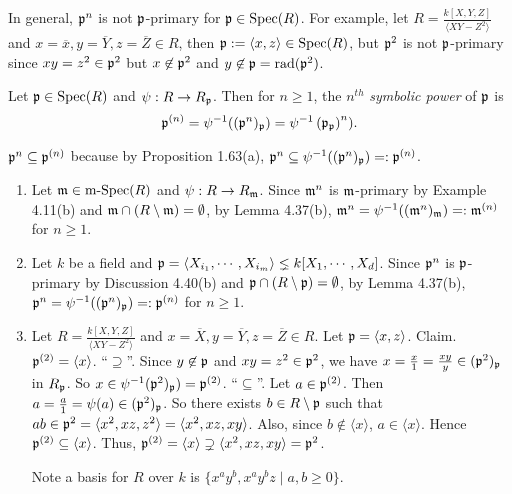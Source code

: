 \begin{example}
    In general, $\mathfrak{p}^{n}$ is not $\mathfrak{p}$-primary for $\mathfrak{p} \in \operatorname{Spec}(R)$. For example, let $R = \frac{k[X,Y,Z]}{\langle XY-Z^{2} \rangle}$ and $x = \overline x,y = \overline Y, z = \overline Z \in R$, then $\mathfrak{p} := \langle x,z \rangle \in \operatorname{Spec}(R)$, but $\mathfrak{p}^{2}$ is not $\mathfrak{p}$-primary since $xy = z^{2} \in \mathfrak{p}^{2}$ but $x \not \in \mathfrak{p}^{2}$ and $y \not \in \mathfrak{p} = \operatorname{rad}(\mathfrak{p}^{2})$.
\end{example}

\begin{definition}
    Let $\mathfrak{p} \in \operatorname{Spec}(R)$ and $\psi: R \to R_{\mathfrak{p}}$. Then for $n \geq 1$, the $n^{th}$ \emph{symbolic power} of $\mathfrak{p}$ is \[\mathfrak{p}^{(n)} = \psi^{-1}((\mathfrak{p}^{n})_{\mathfrak{p}}) = \psi^{-1}\left( \mathfrak{p}_{\mathfrak{p}} \right)^{n}).\] 
\end{definition}

\begin{note}
    $\mathfrak{p}^{n} \subseteq \mathfrak{p}^{(n)}$ because by Proposition 1.63(a), $\mathfrak{p}^{n} \subseteq \psi^{-1}((\mathfrak{p}^{n})_{\mathfrak{p}}) =: \mathfrak{p}^{(n)}$.
\end{note}

\begin{example}
    \begin{enumerate}
        \item 
            Let $\mathfrak{m} \in \operatorname{m-Spec}(R)$ and $\psi: R \to R_{\mathfrak{m}}$. Since $\mathfrak{m}^{n}$ is $\mathfrak{m}$-primary by Example 4.11(b) and $\mathfrak{m} \cap (R \setminus \mathfrak{m}) = \emptyset$, by Lemma 4.37(b), $\mathfrak{m}^{n} = \psi^{-1}((\mathfrak{m}^{n})_{\mathfrak{m}}) =: \mathfrak{m}^{(n)}$ for $n \geq 1$. 
        \item Let $k$ be a field and $\mathfrak{p} = \langle X_{i_1}, \cdots, X_{i_m} \rangle \lneq k[X_1,\cdots,X_d]$. Since $\mathfrak{p}^{n}$ is $\mathfrak{p}$-primary by Discussion 4.40(b) and $\mathfrak{p} \cap (R \setminus \mathfrak{p}) = \emptyset$, by Lemma 4.37(b), $\mathfrak{p}^{n} = \psi^{-1}((\mathfrak{p}^{n})_{\mathfrak{p}}) =: \mathfrak{p}^{(n)}$ for $n \geq 1$.
        \item Let $R = \frac{k[X,Y,Z]}{\langle XY-Z^{2} \rangle}$ and $x = \overbar X, y = \overline Y, z = \overbar Z \in R$. Let $\mathfrak{p} = \langle x, z \rangle$. Claim. $\mathfrak{p}^{(2)} = \langle x \rangle$. ``$\supseteq$''. Since $y \not \in \mathfrak{p}$ and $xy = z^{2} \in \mathfrak{p}^{2}$, we have $x = \frac{x}{1} = \frac{xy}{y} \in (\mathfrak{p}^{2})_{\mathfrak{p}}$ in $R_{\mathfrak{p}}$. So $x \in \psi^{-1}(\mathfrak{p}^{2})_{\mathfrak{p}}) = \mathfrak{p}^{(2)}$. ``$\subseteq$''. Let $a \in \mathfrak{p}^{(2)}$. Then $a = \frac{a}{1} = \psi(a) \in (\mathfrak{p}^{2})_{\mathfrak{p}}$. So there exists $b \in R \setminus \mathfrak{p}$ such that $ab \in \mathfrak{p}^{2} = \langle x^{2},xz,z^{2} \rangle = \langle x^{2}, xz,xy \rangle$. Also, since $b \not \in \langle x \rangle$, $a \in \langle x \rangle$. Hence $\mathfrak{p}^{(2)} \subseteq \langle x \rangle$. Thus, $\mathfrak{p}^{(2)} = \langle x \rangle \supsetneq \langle x^{2},xz,xy \rangle = \mathfrak{p}^{2}$. \par Note a basis for $R$ over $k$ is $\{x^{a}y^{b},x^{a}y^{b}z \mid a,b \geq 0\}$. 
    \end{enumerate}
\end{example}

